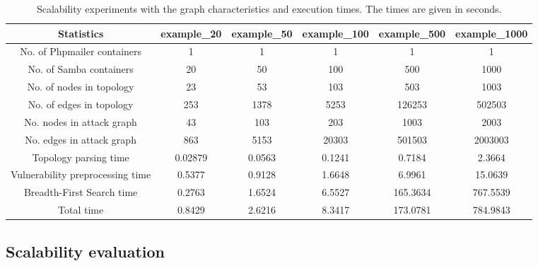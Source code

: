 \begin{table*}
	\begin{center}
		\begin{tabular}{ cccccc } 
			\hline
			Statistics & example\_20 & example\_50 & example\_100 & example\_500 & example\_1000 \\ \hline
			
			No. of Phpmailer containers & 1 & 1 & 1 & 1 & 1 \\ 
			
			No. of Samba containers & 20 & 50 & 100 & 500 & 1000 \\ 
			
			No. of nodes in topology & 23 & 53 & 103 & 503 & 1003\\ 
			
			No. of edges in topology & 253 & 1378 & 5253 & 126253 & 502503 \\ 
			
			No. nodes in attack graph & 43 & 103 & 203 & 1003 & 2003 \\ 
			
			No. edges in attack graph & 863 & 5153 & 20303 & 501503 & 2003003 \\ 
			
			Topology parsing time & 0.02879 & 0.0563 & 0.1241 & 0.7184 & 2.3664 \\ 
			
			Vulnerability preprocessing time & 0.5377 & 0.9128 & 1.6648 & 6.9961 & 15.0639 \\ 
			
			Breadth-First Search time & 0.2763 & 1.6524 & 6.5527 & 165.3634 & 767.5539 \\ 
			
			Total time & 0.8429 & 2.6216 & 8.3417 & 173.0781 & 784.9843 \\ 
			\hline
		\end{tabular}
	\end{center}
	
	\caption{Scalability experiments with the graph characteristics and execution times. The times are given in seconds.}
	
	\label{table_scalability}
\end{table*}

\subsection{Scalability evaluation}
\label{chap:scalability_eval}

